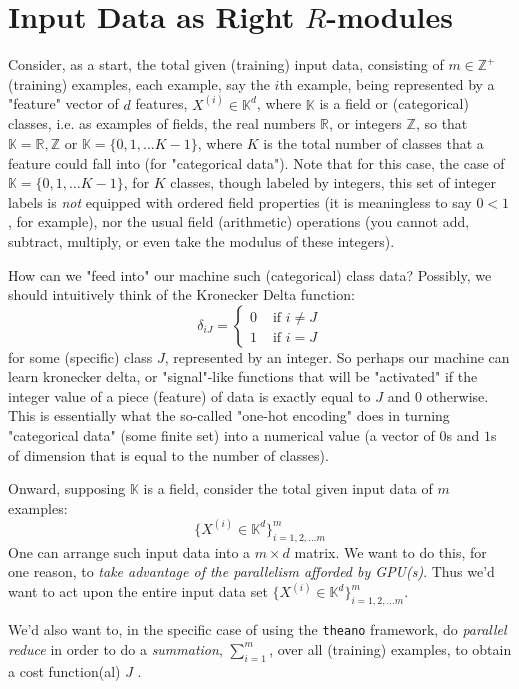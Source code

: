 \documentclass[10pt]{amsart}
\begin{document}
\section{Input Data as Right $R$-modules}

Consider, as a start, the total given (training) input data, consisting of $m\in \mathbb{Z}^+$ (training) examples, each example, say the $i$th example, being represented by a "feature" vector of $d$ features, $X^{(i)} \in \mathbb{K}^d$, where $\mathbb{K}$ is a field or (categorical) classes, i.e. as examples of fields, the real numbers $\mathbb{R}$, or integers $\mathbb{Z}$, so that $\mathbb{K} = \mathbb{R},\mathbb{Z}$ or $\mathbb{K} = \lbrace 0 ,1,\dots K-1\rbrace$, where $K$ is the total number of classes that a feature could fall into (for "categorical data").  Note that for this case, the case of $\mathbb{K}=\lbrace 0 ,1,\dots K-1\rbrace$, for $K$ classes, though labeled by integers, this set of integer labels is \emph{not} equipped with ordered field properties (it is meaningless to say $0<1$, for example), nor the usual field (arithmetic) operations (you cannot add, subtract, multiply, or even take the modulus of these integers).  

How can we "feed into" our machine such (categorical) class data?  Possibly, we should intuitively think of the Kronecker Delta function:
\[
\delta_{iJ} = \begin{cases} 0 & \text{ if } i\neq J \\ 
 1 & \text{ if } i = J \end{cases}
\]
for some (specific) class $J$, represented by an integer.  So perhaps our machine can learn kronecker delta, or "signal"-like functions that will be "activated" if the integer value of a piece (feature) of data is exactly equal to $J$ and $0$ otherwise.  This is essentially what the so-called "one-hot encoding" does in turning "categorical data" (some finite set) into a numerical value (a vector of $0$s and $1$s of dimension that is equal to the number of classes).  

Onward, supposing $\mathbb{K}$ is a field, consider the total given input data of $m$ examples:
\[
\lbrace X^{(i)} \in \mathbb{K}^d\rbrace^m_{i=1,2,\dots m}
\]
One can arrange such input data into a $m\times d$ matrix.  We want to do this, for one reason, to \emph{take advantage of the parallelism afforded by GPU(s)}.  Thus we'd want to act upon the entire input data set $\lbrace X^{(i)} \in \mathbb{K}^d\rbrace^m_{i=1,2,\dots m}$.  

We'd also want to, in the specific case of using the \verb|theano| framework, do \emph{parallel reduce} in order to do a \emph{summation}, $\sum_{i=1}^m$, over all (training) examples, to obtain a cost function(al) $J$ \cite{theano}.  
\end{document}
